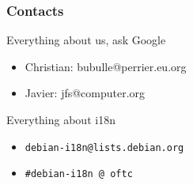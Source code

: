 \documentclass{beamer}
\begin{document}
\begin{frame}
  \frametitle{Contacts}
	\begin{block}
		{Everything about us, ask Google}
		\begin{itemize}
		\item
			{Christian: bubulle@perrier.eu.org}
		\item
			{Javier: jfs@computer.org}
		\end{itemize}
	\end{block}
	\begin{block}
		{Everything about i18n}
		\begin{itemize}
		\item
			{\texttt{debian-i18n@lists.debian.org}}
		\item
			{\texttt{\#debian-i18n @ oftc}}
		\end{itemize}
	\end{block}
\end{frame}
\end{document}
